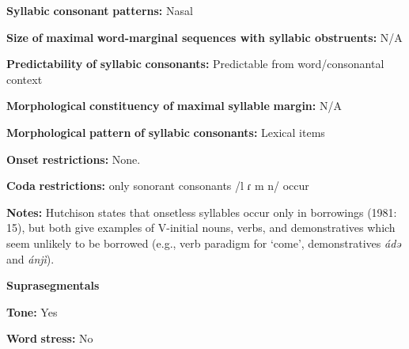 \begin{styleBody}
\textbf{Syllabic} \textbf{consonant} \textbf{patterns:} Nasal
\end{styleBody}

\begin{styleBody}
\textbf{Size} \textbf{of} \textbf{maximal} \textbf{word{}-marginal sequences with syllabic obstruents:} N/A
\end{styleBody}

\begin{styleBody}
\textbf{Predictability} \textbf{of} \textbf{syllabic} \textbf{consonants:} Predictable from word/consonantal context
\end{styleBody}

\begin{styleBody}
\textbf{Morphological} \textbf{constituency} \textbf{of} \textbf{maximal} \textbf{syllable} \textbf{margin:} N/A
\end{styleBody}

\begin{styleBody}
\textbf{Morphological} \textbf{pattern} \textbf{of} \textbf{syllabic} \textbf{consonants:} Lexical items
\end{styleBody}

\begin{styleBody}
\textbf{Onset} \textbf{restrictions:} None.
\end{styleBody}

\begin{styleBody}
\textbf{Coda} \textbf{restrictions:} only sonorant consonants /l ɾ m n/ occur \citep[15]{Hutchison1981}
\end{styleBody}

\begin{styleBody}
\textbf{Notes:} Hutchison states that onsetless syllables occur only in borrowings (1981: 15), but both \citet{HutchisonCyffer1998} give examples of V-initial nouns, verbs, and demonstratives which seem unlikely to be borrowed (e.g., verb paradigm for ‘come’, demonstratives \textit{ádə} and \textit{ánjì}).
\end{styleBody}

\begin{styleBody}
\textbf{Suprasegmentals}
\end{styleBody}

\begin{styleBody}
\textbf{Tone:} Yes
\end{styleBody}

\begin{styleBody}
\textbf{Word} \textbf{stress:} No
\end{styleBody}

